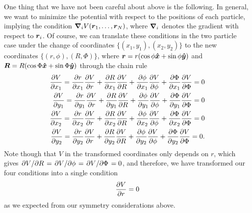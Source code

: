 One thing that we have not been careful about above is the following.
In general, we want to minimize the potential with respect to the positions of each particle, implying the condition $\grad_{i} V(\vb*{r}_{1},\ldots,\vb*{r}_{N})$, where $\grad_{i}$ denotes the gradient with respect to $\vb*{r}_{i}$.
Of course, we can translate these conditions in the two particle case under the change of coordinates $\{(x_1,y_1),(x_2,y_2)\}$ to the new coordinates $\{(r,\phi),(R,\Phi)\}$, where $\vb*{r} = r(\cos{\phi} \vu*{x} + \sin{\phi} \vu*{y})$ and $\vb*{R} = R (\cos{\Phi} \vu*{x} + \sin{\Phi} \vu*{y})$ through the chain rule
\begin{align}
\begin{aligned} 
    \pdv{V}{x_1} = \pdv{r}{x_1} \pdv{V}{r} + \pdv{R}{x_1} \pdv{V}{R} + \pdv{\phi}{x_1} \pdv{V}{\phi} + \pdv{\Phi}{x_1} \pdv{V}{\Phi} = 0 \\
    \pdv{V}{y_1} = \pdv{r}{y_1} \pdv{V}{r} + \pdv{R}{y_1} \pdv{V}{R} + \pdv{\phi}{y_1} \pdv{V}{\phi} + \pdv{\Phi}{y_1} \pdv{V}{\Phi} = 0 \\
    \pdv{V}{x_2} = \pdv{r}{x_2} \pdv{V}{r} + \pdv{R}{x_2} \pdv{V}{R} + \pdv{\phi}{x_2} \pdv{V}{\phi} + \pdv{\Phi}{x_2} \pdv{V}{\Phi} = 0 \\
    \pdv{V}{y_2} = \pdv{r}{y_2} \pdv{V}{r} + \pdv{R}{y_2} \pdv{V}{R} + \pdv{\phi}{y_2} \pdv{V}{\phi} + \pdv{\Phi}{y_2} \pdv{V}{\Phi} = 0
.\end{aligned}
\end{align}
Note though that $V$ in the transformed coordinates only depends on $r$, which gives $\pdv*{V}{R} = \pdv*{V}{\phi} = \pdv*{V}{\Phi} = 0$, and therefore, we have transformed our four conditions into a single condition
\begin{align}
    \pdv{V}{r} = 0
\end{align}
as we expected from our symmetry considerations above.

